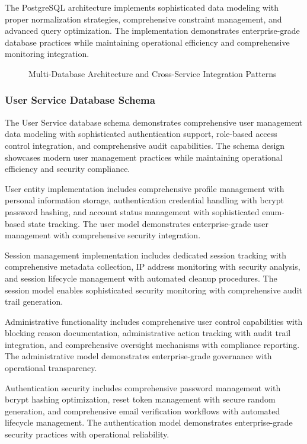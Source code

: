 The PostgreSQL architecture implements sophisticated data modeling with proper normalization strategies, comprehensive constraint management, and advanced query optimization. The implementation demonstrates enterprise-grade database practices while maintaining operational efficiency and comprehensive monitoring integration.

\begin{figure}[H]
\centering
\caption{Multi-Database Architecture and Cross-Service Integration Patterns}
\label{fig:database-architecture-integration}
\end{figure}

\subsubsection{User Service Database Schema}

The User Service database schema demonstrates comprehensive user management data modeling with sophisticated authentication support, role-based access control integration, and comprehensive audit capabilities. The schema design showcases modern user management practices while maintaining operational efficiency and security compliance.

User entity implementation includes comprehensive profile management with personal information storage, authentication credential handling with bcrypt password hashing, and account status management with sophisticated enum-based state tracking. The user model demonstrates enterprise-grade user management with comprehensive security integration.

Session management implementation includes dedicated session tracking with comprehensive metadata collection, IP address monitoring with security analysis, and session lifecycle management with automated cleanup procedures. The session model enables sophisticated security monitoring with comprehensive audit trail generation.

Administrative functionality includes comprehensive user control capabilities with blocking reason documentation, administrative action tracking with audit trail integration, and comprehensive oversight mechanisms with compliance reporting. The administrative model demonstrates enterprise-grade governance with operational transparency.

Authentication security includes comprehensive password management with bcrypt hashing optimization, reset token management with secure random generation, and comprehensive email verification workflows with automated lifecycle management. The authentication model demonstrates enterprise-grade security practices with operational reliability.

